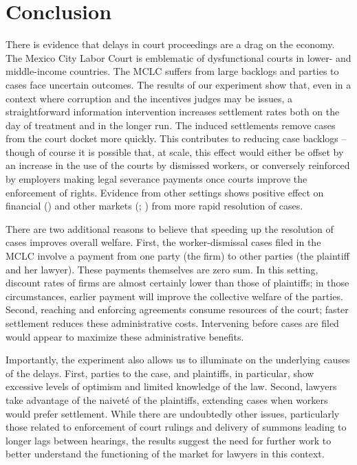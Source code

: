 \documentclass[11pt, a4paper]{article}
\begin{document}
\section{Conclusion}
\label{Conclusion}
There is evidence that delays in court proceedings are a drag on the economy. The Mexico City Labor Court is emblematic of dysfunctional courts in lower- and middle-income countries. The MCLC suffers from large backlogs and parties to cases face uncertain outcomes. The results of our experiment show that, even in a context where corruption and the incentives judges may be issues, a straightforward information intervention increases settlement rates both on the day of treatment and in the longer run. The induced settlements remove cases from the court docket more quickly. This contributes to reducing case backlogs -- though of course it is possible that, at scale, this effect would either be offset by an increase in the use of the courts by dismissed workers, or conversely reinforced by employers making legal severance payments once courts improve the enforcement of rights. Evidence from other settings shows positive effect on financial (\cite{PonticelliAlencar_Bankrupcy}) and other markets (\cite{10.1093/qje/qjaa020}; \cite{Chemin_ReStat}) from more rapid resolution of cases. 

There are two additional reasons to believe that speeding up the resolution of cases improves overall welfare. First, the worker-dismissal cases filed in the MCLC involve a payment from one party (the firm) to other parties (the plaintiff and her lawyer). These payments themselves are zero sum. In this setting, discount rates of firms are almost certainly lower than those of plaintiffs; in those circumstances, earlier payment will improve the collective welfare of the parties. Second, reaching and enforcing agreements consume resources of the court; faster settlement reduces these administrative costs. Intervening before cases are filed would appear to maximize these administrative benefits. 

Importantly, the experiment also allows us to illuminate on the underlying causes of the delays. First, parties to the case, and plaintiffs, in particular, show excessive levels of optimism and limited knowledge of the law. Second, lawyers take advantage of the naivet\'e of the plaintiffs, extending cases when workers would prefer settlement. While there are undoubtedly other issues, particularly those related to enforcement of court rulings and delivery of summons leading to longer lags between hearings, the results suggest the need for further work to better understand the functioning of the market for lawyers in this context. 
\end{document}
